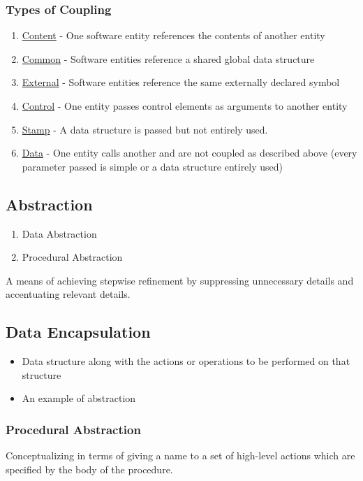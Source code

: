 \documentclass{report}
\begin{document}
				\subsubsection{Types of Coupling}
					\begin{enumerate}
						\item \underline{Content} - One software entity references the contents of another entity
						\item \underline{Common} - Software entities reference a shared global data structure
						\item \underline{External} - Software entities reference the same externally declared symbol
						\item \underline{Control} - One entity passes control elements as arguments to another entity
						\item \underline{Stamp} - A data structure is passed but not entirely used.
						\item \underline{Data} - One entity calls another and are not coupled as described above (every parameter passed is simple or a data structure entirely used)
					\end{enumerate}
			\subsection{Abstraction}
				\begin{enumerate}
					\item Data Abstraction
					\item Procedural Abstraction
				\end{enumerate}
				A means of achieving stepwise refinement by suppressing unnecessary details and accentuating relevant details.
			\subsection{Data Encapsulation}
				\begin{itemize}
					\item Data structure along with the actions or operations to be performed on that structure
					\item An example of abstraction
				\end{itemize}
				\subsubsection{Procedural Abstraction}
					Conceptualizing in terms of giving a name to a set of high-level actions which are specified by the body of the procedure.
\end{document}
